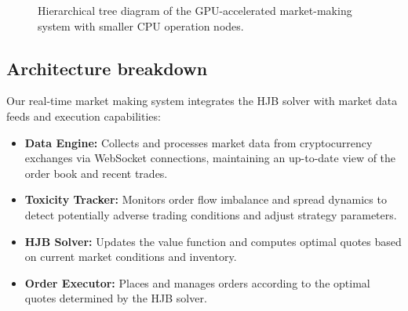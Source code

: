\documentclass[twocolumn,ieee]{arithmaxresearch}
\begin{document}
\begin{onecolumn}
\begin{onecolumn}
\begin{figure}[h]
\centering
{}
\caption{Hierarchical tree diagram of the GPU-accelerated market-making system with smaller CPU operation nodes.}
\label{fig:tree}
\end{figure}

\subsection{Architecture breakdown}

Our real-time market making system integrates the HJB solver with market data feeds and execution capabilities:

\begin{itemize}
    \item \textbf{Data Engine:} Collects and processes market data from cryptocurrency exchanges via WebSocket connections, maintaining an up-to-date view of the order book and recent trades.
    
    \item \textbf{Toxicity Tracker:} Monitors order flow imbalance and spread dynamics to detect potentially adverse trading conditions and adjust strategy parameters.
    
    \item \textbf{HJB Solver:} Updates the value function and computes optimal quotes based on current market conditions and inventory.
    
    \item \textbf{Order Executor:} Places and manages orders according to the optimal quotes determined by the HJB solver.
    

\end{itemize}
\end{onecolumn}
\end{onecolumn}
\end{document}
